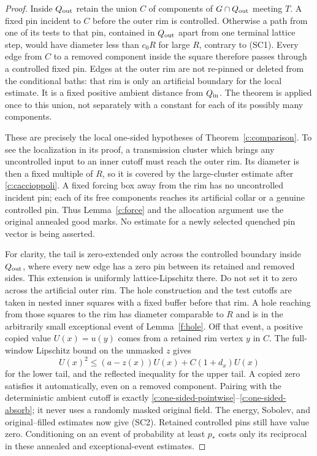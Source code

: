 \begin{proof}
Inside $Q_{\rm out}$ retain the union $C$ of components of
$G\cap Q_{\rm out}$ meeting $T$. A fixed pin incident to $C$ before
the outer rim is controlled. Otherwise a path from one of its tests
to that pin, contained in $Q_{\rm out}$ apart from one terminal lattice
step, would have diameter less than $c_0R$ for large $R$, contrary to
(SC1). Every edge from $C$ to a removed component inside the square
therefore passes through a controlled fixed pin. Edges at the outer
rim are not re-pinned or deleted from the conditional baths: that rim
is only an artificial boundary for the local estimate. It is a fixed
positive ambient distance from $Q_{\rm in}$.
The theorem is applied once to this union, not separately with a constant
for each of its possibly many components.

These are precisely the local one-sided hypotheses of
Theorem~\ref{c:comparison}. To see the localization in its proof,
a transmission cluster which brings any uncontrolled input to an
inner cutoff must reach the outer rim. Its diameter is then a fixed
multiple of $R$, so it is covered by the large-cluster estimate after
\eqref{c:caccioppoli}. A fixed forcing box away from the rim has no
uncontrolled incident pin; each of its free components reaches its
artificial collar or a genuine controlled pin. Thus
Lemma~\ref{c:force} and the allocation argument use the original
annealed good marks. No estimate for a newly selected quenched pin
vector is being asserted.

For clarity, the tail is zero-extended only across the controlled
boundary inside $Q_{\rm out}$, where every new edge has a zero pin
between its retained and removed sides. This extension is uniformly
lattice-Lipschitz there. Do not set it to zero across the artificial
outer rim. The hole construction and the test cutoffs are taken in
nested inner squares with a fixed buffer before that rim. A hole
reaching from those squares to the rim has diameter comparable to $R$
and is in the arbitrarily small exceptional event of
Lemma~\ref{f:hole}. Off that event, a positive copied value $U(x)=u(y)$
comes from a retained rim vertex $y$ in $C$. The full-window Lipschitz
bound on the unmasked $z$ gives
\[
 U(x)^2\le(a-z(x))U(x)+C(1+d_x)U(x)
\]
for the lower tail, and the reflected inequality for the upper tail.
A copied zero satisfies it automatically, even on a removed component.
Pairing with the deterministic ambient cutoff is exactly
\eqref{c:one-sided-pointwise}--\eqref{c:one-sided-absorb}; it never
uses a randomly masked original field. The energy, Sobolev, and
original--filled estimates now give (SC2). Retained controlled pins
still have value zero. Conditioning on an event of probability at
least $p_*$ costs only its reciprocal in these annealed and
exceptional-event estimates.
\end{proof}


